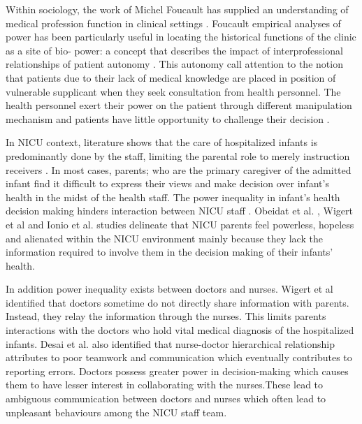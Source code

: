 Within sociology, the work of Michel Foucault has supplied an understanding of medical profession function in clinical settings \citep{Powers2003, Molina2018, Bristowe2014}. Foucault empirical analyses of power has been particularly useful in locating the historical functions of the clinic as a site of bio- power: a concept that describes the impact of interprofessional relationships of patient autonomy \citep{Bristowe2014, Foucault1982, Ameen2017}. This autonomy call attention to the notion that patients due to their lack of medical knowledge are placed in position of vulnerable supplicant when they seek consultation from health personnel. The health personnel exert their power on the patient through different manipulation mechanism and patients have little opportunity to challenge their decision \citep{Molina2018, Powers2003}.

In NICU context, literature shows that the care of hospitalized infants is predominantly done by the staff, limiting the parental role to merely instruction receivers \citep{Jones2007a,Obeidat2009, Heidari2015a}. In most cases, parents; who are the primary caregiver of the admitted infant find it difficult to  express their views and make decision over infant's health in the midst of the health staff. The power inequality in infant's health decision making hinders interaction between NICU staff \citep{Jones2007a, VanMcCrary2014}.  Obeidat et al. \citep{Obeidat2009}, Wigert et al \citep{Wigert2014b} and Ionio et al. \citep{Ionio2016} studies delineate that NICU parents feel powerless, hopeless and alienated within the NICU environment mainly because they lack the information required to involve them in the decision making of their infants' health.  

In addition power inequality exists between doctors and nurses. Wigert et al \citep{Wigert2012} identified that doctors sometime do not directly share information with parents. Instead, they relay the information through the nurses. This limits parents interactions with the doctors who hold vital medical diagnosis of the hospitalized infants. Desai et al. \citep{Desai2017} also identified that nurse-doctor hierarchical relationship attributes to poor teamwork and communication which eventually contributes to reporting errors. Doctors possess greater power in decision-making which causes them to have lesser interest in collaborating with the nurses.These lead to ambiguous communication between doctors and nurses which often lead to  unpleasant behaviours among the NICU staff team. 

